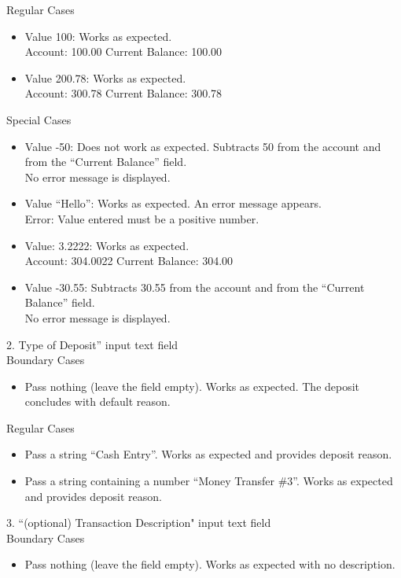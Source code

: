 \documentclass[12pt]{article}
\begin{document}
Regular Cases
\begin{itemize}
  \item Value 100: Works as expected.\\
Account: 100.00 Current Balance: 100.00
  \item Value 200.78: Works as expected.\\
Account: 300.78 Current Balance: 300.78
\end{itemize}

Special Cases
\begin{itemize}
  \item Value -50: Does not work as expected. Subtracts 50 from the account and from the ``Current Balance'' field.\\
No error message is displayed.
  \item Value ``Hello'': Works as expected. An error message appears.\\
Error: Value entered must be a positive number.
  \item Value: 3.2222: Works as expected.\\
Account: 304.0022 Current Balance: 304.00
  \item Value -30.55: Subtracts 30.55 from the account and from the ``Current Balance'' field.\\
No error message is displayed.
\end{itemize}

2. Type of Deposit'' input text field\\

Boundary Cases
\begin{itemize}
  \item Pass nothing (leave the field empty). Works as expected. The deposit concludes with default reason.
\end{itemize}

Regular Cases
\begin{itemize}
  \item Pass a string  ``Cash Entry''. Works as expected and provides deposit reason.
  \item Pass a string containing a number  ``Money Transfer \#3''. Works as expected and provides deposit reason.
\end{itemize}

3. ``(optional) Transaction Description" input text field \\

Boundary Cases
\begin{itemize}
  \item Pass nothing (leave the field empty). Works as expected with no description.
\end{itemize}
\end{document}
